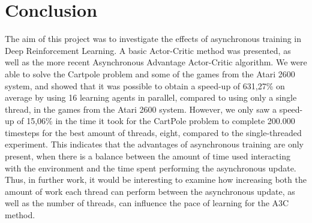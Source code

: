 \documentclass[11pt]{article}
\begin{document}
\section{Conclusion}

The aim of this project was to investigate the effects of asynchronous
training in Deep Reinforcement Learning.
A basic Actor-Critic method was presented,
as well as the more recent Asynchronous Advantage Actor-Critic algorithm.
We were able to solve the Cartpole problem and some of the games from the
Atari 2600 system, and showed that it was possible to obtain a
speed-up of 631,27\% on average by using 16 learning agents in parallel, compared to
using only a single thread, in the games from the Atari 2600 system.
However, we only saw a speed-up of 15,06\% in the time it took for the CartPole problem
to complete 200.000 timesteps for the best amount of threads, eight, compared to the
single-threaded experiment.
This indicates that the advantages of asynchronous training are only present, when
there is a balance between the amount of time used interacting with the environment
and the time spent performing the asynchronous update.
Thus, in further work, it would be interesting to examine how increasing both the
amount of work each thread can perform between the asynchronous update, as
well as the number of threads, can influence the pace of learning for the A3C method.
\end{document}
